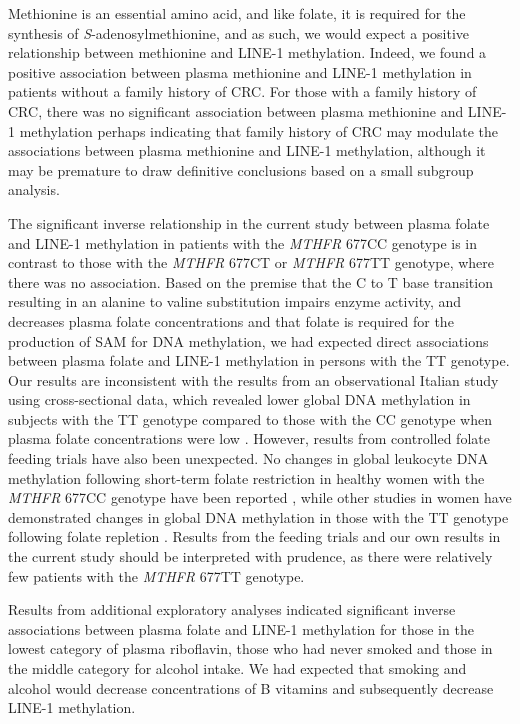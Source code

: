 \noindent Methionine is an essential amino acid, and like folate, it is required for the synthesis of \emph{S}-adenosylmethionine, and as such, we would expect a positive relationship between methionine and LINE-1 methylation. Indeed, we found a positive association between plasma methionine and LINE-1 methylation in patients without a family history of CRC. For those with a family history of CRC, there was no significant association between plasma methionine and LINE-1 methylation perhaps indicating that family history of CRC may modulate the associations between plasma methionine and LINE-1 methylation, although it may be premature to draw definitive conclusions based on a small subgroup analysis.

\noindent The significant inverse relationship in the current study between plasma folate and LINE-1 methylation in patients with the \emph{MTHFR} 677CC genotype is in contrast to those with the \emph{MTHFR} 677CT or \emph{MTHFR} 677TT genotype, where there was no association. Based on the premise that the C to T base transition resulting in an alanine to valine substitution impairs enzyme activity, and decreases plasma folate concentrations \cite{c523,c556} and that folate is required for the production of SAM for DNA methylation, we had expected direct associations between plasma folate and LINE-1 methylation in persons with the TT genotype. Our results are inconsistent with the results from an observational Italian study using cross-sectional data, which revealed lower global DNA methylation in subjects with the TT genotype compared to those with the CC genotype when plasma folate concentrations were low \cite{c557}. However, results from controlled folate feeding trials have also been unexpected. No changes in global leukocyte DNA methylation following short-term folate restriction in healthy women with the \emph{MTHFR} 677CC genotype have been reported \cite{c528}, while other studies in women have demonstrated changes in global DNA methylation in those with the TT genotype following folate repletion \cite{c558,c559}. Results from the feeding trials and our own results in the current study should be interpreted with prudence, as there were relatively few patients with the \emph{MTHFR} 677TT genotype.

\noindent Results from additional exploratory analyses indicated significant inverse associations between plasma folate and LINE-1 methylation for those in the lowest category of plasma riboflavin, those who had never smoked and those in the middle category for alcohol intake. We had expected that smoking and alcohol would decrease concentrations of B vitamins and subsequently decrease LINE-1 methylation.

